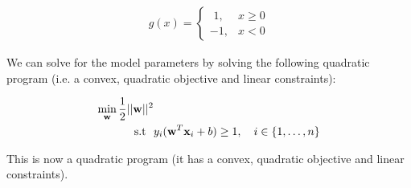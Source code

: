 \begin{align}
g(x) =  \begin{cases}
  \mbox{ 1}, & x \geq 0 \\
 -1, & x < 0
 \end{cases} 
\end{align}


We can solve for the model parameters by solving the following quadratic program (i.e. a convex, quadratic objective and linear constraints):

\begin{align}
\min_{\mathbf{w}} \frac{1}{2}||\mathbf{w}||^2 & \\
\mbox{\text{s.t }  } &  y_i (\mathbf{w}^T \mathbf{x}_i + b) \geq 1, \quad i \in \{1, \dots, n\}
\end{align}

This is now a quadratic program (it has a convex, quadratic objective and linear constraints).


